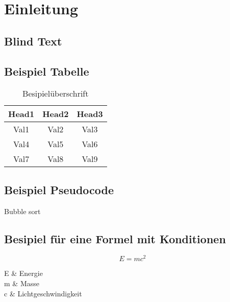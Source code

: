 
\chapter{Einleitung}\label{chap:Einleitung}

\section{Blind Text}

\blindtext[5]

\section{Beispiel Tabelle}

\begin{table}[H]
	\centering
	\begin{tabular}{c|c|c}
		\hline
		\textbf{Head1} & \textbf{Head2} & \textbf{Head3} \\ 
		\hline
		\hline 
		
		Val1 & Val2 & Val3 \\
		Val4 & Val5 & Val6 \\
		Val7 & Val8 & Val9 \\
		
		\hline
	\end{tabular} 
	\caption{Besipielüberschrift}
	\label{tab:Qualitätswerte}
\end{table}

\section{Beispiel Pseudocode}

\begin{algorithm}
	\caption{Bubble sort}
	\label{alg:bubblesort}
	\begin{algorithmic}[1]
				\ENDIF
			\ENDFOR
        \ENDFOR
	\end{algorithmic}
\end{algorithm}

\section{Besipiel für eine Formel mit Konditionen}

\begin{equation*}
	E = mc^2
\end{equation*}
\begin{conditions}
	E	&	Energie \\
	m	&	Masse \\
	c	&	Lichtgeschwindigkeit  
\end{conditions}
